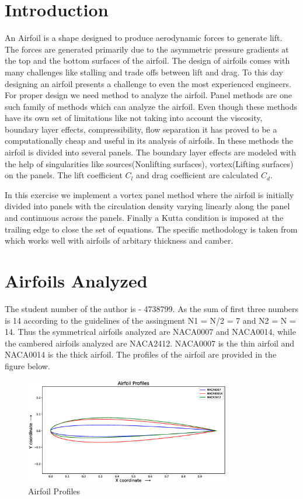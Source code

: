 \documentclass[main.tex]{subfiles}
\begin{document}
\section{Introduction}
An Airfoil is a shape designed to produce aerodynamic forces to generate lift. The forces are generated primarily due to the asymmetric pressure gradients at the top and the bottom surfaces of the airfoil. The design of airfoils comes with many challenges like stalling and trade offs between lift and drag. To this day designing an airfoil presents a challenge to even the most experienced engineers. For proper design we need method to analyze the airfoil. Panel methods are one such family of methods which can analyze the airfoil. Even though these methods have its own set of limitations like not taking into account the viscosity, boundary layer effects, compressibility, flow separation it has proved to be a computationally cheap and useful in its analysis of airfoils. In these methods the airfoil is divided into several panels. The boundary layer effects are modeled with the help of singularities like sources(Nonlifting surfaces), vortex(Lifting surfaces) on the panels. The lift coefficient $C_l$ and drag coefficient are calculated $C_d$.

In this exercise we implement a vortex panel method where the airfoil is initially divided into panels with the circulation density varying linearly along the panel and continuous across the panels. Finally a Kutta condition is imposed at the trailing edge to close the set of equations. The specific methodology is taken from \cite{Panelmethod} which works well with airfoils of arbitary thickness and camber. 

\section{Airfoils Analyzed}
The student number of the author is - 4738799. As the sum of first three numbers is 14 according to the guidelines of the assingment N1 = N/2 = 7 and N2 = N = 14. Thus the
symmetrical airfoils analyzed are NACA0007 and NACA0014, while the cambered airfoils
analyzed are NACA2412. NACA0007 is the thin airfoil and NACA0014 is the thick airfoil.
The profiles of the airfoil are provided in the figure below. 
\begin{figure}[h!]
\vspace*{-0.5em}\centering
\includegraphics[width=0.8\textwidth]{./Images/Assingment1/Airfoils.eps}
\caption{Airfoil Profiles}\vspace*{-0.5em}
\label{fig1}
\end{figure}\vspace*{-1.0em}
\end{document}
